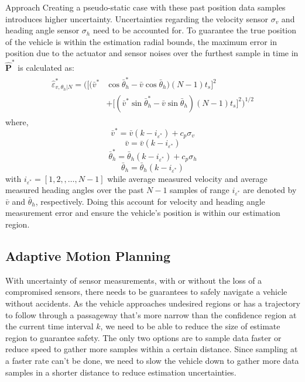 \begin{section}{Approach}
Creating a pseudo-static case with these past position data samples introduces higher uncertainty. Uncertainties regarding the velocity sensor $\sigma_v$ and heading angle sensor $\sigma_h$ need to be accounted for. To guarantee the true position of the vehicle is within the estimation radial bounds, the maximum error in position due to the actuator and sensor noises over the furthest sample in time in $\hat{\bm{P}}^*$ is calculated as:
    \begin{align}
    \begin{split}
	\hat{\varepsilon}_{v,\theta_h|N}^{*}=\Big( \big[(\bar{v}^*& \cos{\bar{\theta}_h^*} - \bar{v}\cos{\bar{\theta}_h})(N-1)t_s \big]^2 \\
	&+ \big[ (\bar{v}^* \sin{\bar{\theta}_h^*} - \bar{v}\sin{\bar{\theta}_h})(N-1)t_s \big]^2 \Big) ^{1/2}
	\end{split}
	\end{align}
where,
    \begin{equation}
	\bar{v}^{*}=\bar{v}(k-i_{\varepsilon^{*}})+c_p\sigma_v \nonumber
	\end{equation}
    \begin{equation}
	\bar{v}=\bar{v}(k-i_{\varepsilon^{*}}) \nonumber
	\end{equation}
	\begin{equation}
	\bar{\theta}_h^{*}=\bar{\theta}_h(k-i_{\varepsilon^{*}})+c_p\sigma_h \nonumber
	\end{equation}
	\begin{equation}
	\bar{\theta}_h=\bar{\theta}_h(k-i_{\varepsilon^{*}}) \nonumber
	\end{equation}
with $i_{\varepsilon^{*}}=[1,2,,\dots,N-1]$ while average measured velocity and average measured heading angles over the past $N-1$ samples of range $i_{\varepsilon^{*}}$ are denoted by $\bar{v}$ and $\bar{\theta}_h$, respectively. Doing this account for velocity and heading angle measurement error and ensure the vehicle's position is within our estimation region.


\subsection{Adaptive Motion Planning}
With uncertainty of sensor measurements, with or without the loss of a compromised sensors, there needs to be guarantees to safely navigate a vehicle without accidents. As the vehicle approaches undesired regions or has a trajectory to follow through a passageway that's more narrow than the confidence region at the current time interval $k$, we need to be able to reduce the size of estimate region to guarantee safety. The only two options are to sample data faster or reduce speed to gather more samples within a certain distance. Since sampling at a faster rate can't be done, we need to slow the vehicle down to gather more data samples in a shorter distance to reduce estimation uncertainties.


\end{section}
